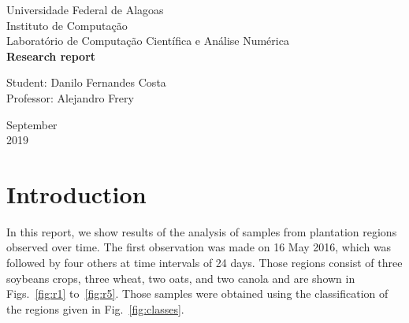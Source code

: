 \documentclass[12pt]{article}
\begin{document}

\onehalfspacing

\begin{titlepage}
\begin{center}

\Huge{Universidade Federal de Alagoas}\\
\large{Instituto de Computação}\\ 
\large{Laboratório de Computação Científica e Análise Numérica}\\ 
\vspace{220pt}
\textbf{\LARGE{Research report}}\\
\vspace{3,5cm}
\end{center}

\begin{flushleft}
\begin{tabbing}
Student: Danilo Fernandes Costa\\
Professor: Alejandro Frery\\
\end{tabbing}
\end{flushleft}
\vspace{1cm}

\begin{center}
\vspace{\fill}
September\\
2019
\end{center}
\end{titlepage}

\section{Introduction}

In this report, we show results of the analysis of samples from plantation regions observed over time.
The first observation was made on 16 May 2016, which was followed by four others at time intervals of 24 days. 
Those regions consist of three soybeans crops, three wheat, two oats, and two canola and are shown in Figs.~\ref{fig:r1} to~\ref{fig:r5}. 
Those samples were obtained using the classification of the regions given in Fig.~\ref{fig:classes}.

\end{document}
